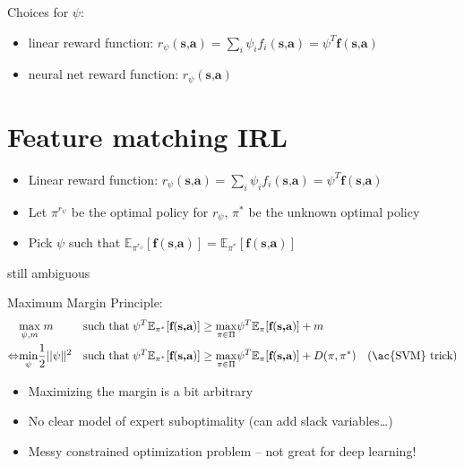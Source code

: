 Choices for $\psi$:
\begin{itemize}
	\item linear reward function: $r_\psi(\textbf{s,a}) = \sum_i \psi_i f_i(\textbf{s,a}) = \psi^T \textbf{f}(\textbf{s,a})$
	\item neural net reward function: $r_\psi(\textbf{s,a})$
\end{itemize}

\section{Feature matching IRL}
\begin{itemize}
	\item Linear reward function: $r_\psi(\textbf{s,a}) = \sum_i \psi_i f_i(\textbf{s,a}) = \psi^T \textbf{f}(\textbf{s,a})$
	\item Let $\pi^{r_\psi}$ be the optimal policy for $r_\psi$, $\pi^*$ be the unknown optimal policy
	\item Pick $\psi$ such that $\mathbb{E}_{\pi^{r_\psi}}[\textbf{f}(\textbf{s,a})] = \mathbb{E}_{\pi^*} [\textbf{f}(\textbf{s,a})]$
\end{itemize}

 still ambiguous

Maximum Margin Principle:
\begin{align*}
	&\underset{\psi, m}{\max}\; m &&\text{such that}\; \psi^T \mathbb{E}_{\pi^*}[\textbf{f}(\textbf{s,a})] \geq \underset{\pi \in \Pi}{\max} \psi^T \mathbb{E}_\pi [\textbf{f}(\textbf{s,a})] + m\\
	\Leftrightarrow &\underset{\psi}{\min} \frac{1}{2} ||\psi||^2 &&\text{such that}\; \psi^T \mathbb{E}_{\pi^*}[\textbf{f}(\textbf{s,a})] \geq \underset{\pi \in \Pi}{\max} \psi^T \mathbb{E}_\pi [\textbf{f}(\textbf{s,a})] + D(\pi, \pi^*) \quad\text{(\ac{SVM} trick)}
\end{align*}

 \cite{abbeel2004apprenticeship, ratliff2006maximum}
\begin{itemize}
	\item Maximizing the margin is a bit arbitrary
	\item No clear model of expert suboptimality (can add slack variables…)
	\item Messy constrained optimization problem – not great for deep learning!
\end{itemize}

